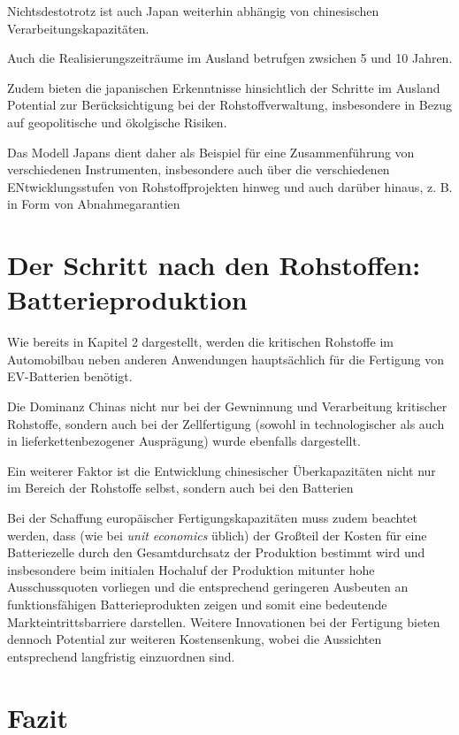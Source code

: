 \documentclass[12pt,a4paper,oneside]{book} %
\begin{document}
{Nichtsdestotrotz ist auch Japan weiterhin abhängig von chinesischen Verarbeitungskapazitäten.

Auch die Realisierungszeiträume im Ausland betrufgen zwsichen 5 und 10 Jahren.

Zudem bieten die japanischen Erkenntnisse hinsichtlich der Schritte im Ausland Potential zur Berücksichtigung bei der Rohstoffverwaltung, insbesondere in Bezug auf geopolitische und ökolgische Risiken.

Das Modell Japans dient daher als Beispiel für eine Zusammenführung von verschiedenen Instrumenten, insbesondere auch über die verschiedenen ENtwicklungsstufen von Rohstoffprojekten hinweg und auch darüber hinaus, z. B. in Form von Abnahmegarantien

\section{Der Schritt nach den Rohstoffen: Batterieproduktion}

Wie bereits in Kapitel 2 dargestellt, werden die kritischen Rohstoffe im Automobilbau neben anderen Anwendungen hauptsächlich für die Fertigung von EV-Batterien benötigt.

Die Dominanz Chinas nicht nur bei der Gewninnung und Verarbeitung kritischer Rohstoffe, sondern auch bei der Zellfertigung (sowohl in technologischer als auch in lieferkettenbezogener Ausprägung) wurde ebenfalls dargestellt.

Ein weiterer Faktor ist die Entwicklung chinesischer Überkapazitäten nicht nur im Bereich der Rohstoffe selbst, sondern auch bei den Batterien

Bei der Schaffung europäischer Fertigungskapazitäten muss zudem beachtet werden, dass (wie bei \textit{unit economics} üblich) der Großteil der Kosten für eine Batteriezelle durch den Gesamtdurchsatz der Produktion bestimmt wird und insbesondere beim initialen Hochaluf der Produktion mitunter hohe Ausschussquoten vorliegen und die entsprechend geringeren Ausbeuten an funktionsfähigen Batterieprodukten zeigen und somit eine bedeutende Markteintrittsbarriere darstellen.\autocite{McBridge, S. 9} Weitere Innovationen bei der Fertigung bieten dennoch Potential zur weiteren Kostensenkung, wobei die Aussichten entsprechend langfristig einzuordnen sind.\autocite{McBridge, S. 10}

\section{Fazit}

}
\end{document}
